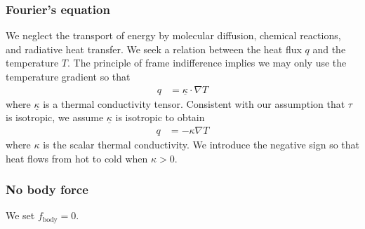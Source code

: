 \documentclass[letterpaper,11pt,nointlimits]{amsart}
\begin{document}
\subsubsection{Fourier's equation}

We neglect the transport of energy by molecular diffusion, chemical
reactions, and radiative heat transfer.  We seek a relation between
the heat flux $q$ and the temperature $T$.  The principle of 
frame indifference implies we may only use the temperature gradient
so that
\begin{align}
  \label{eq:fouriertensorlaw}
  q &= \underline{\kappa} \cdot \nabla{} T
\end{align}
where $\underline{\kappa}$ is a thermal conductivity tensor.  
Consistent with our assumption that $\tau$ is isotropic, we assume
$\underline{\kappa}$ is isotropic to obtain 
\begin{align}
  \label{eq:fourierlaw}
  q &= - \kappa \nabla{} T
\end{align}
where $\kappa$ is the scalar thermal conductivity.  We introduce the
negative sign so that heat flows from hot to cold when $\kappa>0$.

\subsubsection{No body force}

We set $f_{\text{body}} = 0$.

\end{document}
